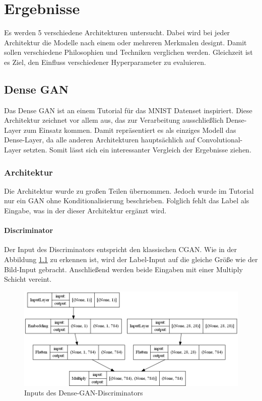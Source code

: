 
\chapter{Ergebnisse}
Es werden 5 verschiedene Architekturen untersucht.
Dabei wird bei jeder Architektur die Modelle nach einem oder mehreren Merkmalen designt.
Damit sollen verschiedene Philosophien und Techniken verglichen werden.
Gleichzeit ist es Ziel, den Einfluss verschiedener Hyperparameter zu evaluieren.

\section{Dense GAN}
\label{section:dense-gan}
Das Dense GAN ist an einem Tutorial für das MNIST Datenset inspiriert.
Diese Architektur zeichnet vor allem aus, das zur Verarbeitung ausschließlich Dense-Layer zum Einsatz kommen.
Damit repräsentiert es als einziges Modell das Dense-Layer, da alle anderen Architekturen hauptsächlich auf Convolutional-Layer setzten.
Somit lässt sich ein interessanter Vergleich der Ergebnisse ziehen.

\subsection{Architektur}
Die Architektur wurde zu großen Teilen übernommen.
Jedoch wurde im Tutorial nur ein GAN ohne Konditionalisierung beschrieben.
Folglich fehlt das Label als Eingabe, was in der dieser Architektur ergänzt wird.
\newline

\subsubsection{Discriminator}
Der Input des Discriminators entspricht den klassischen CGAN.
Wie in der Abbildung \ref{architecture:densegan-dis-input} zu erkennen ist, wird der Label-Input auf die gleiche Größe wie der Bild-Input gebracht.
Anschließend werden beide Eingaben mit einer Multiply Schicht vereint.

\begin{figure}[H]
	\centering
	\includegraphics[height=0.3\textheight]{kapitel/5_ergebnisse/architectures/densegan_discriminator/inputs.png}
	\caption{Inputs des Dense-GAN-Discriminators}
	\label{architecture:densegan-dis-input}
\end{figure}

